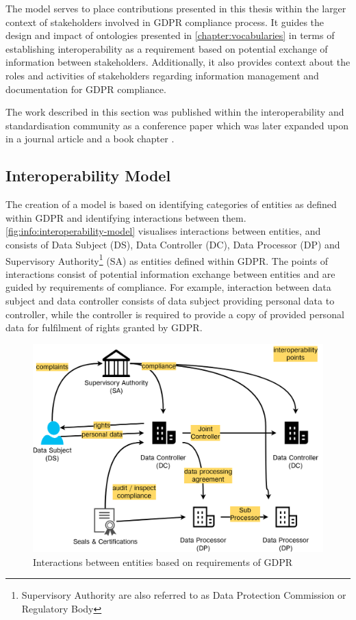 The model serves to place contributions presented in this thesis within the larger context of stakeholders involved in GDPR compliance process. It guides the design and impact of ontologies presented in \autoref{chapter:vocabularies} in terms of establishing interoperability as a requirement based on potential exchange of information between stakeholders. Additionally, it also provides context about the roles and activities of stakeholders regarding information management and documentation for GDPR compliance.

The work described in this section was published within the interoperability and standardisation community as a conference paper
\cite{pandit_gdpr_2018} which was later expanded upon in a journal article \cite{pandit_exploration_2018} and a book chapter \cite{pandit_standardisation_2020}.

\subsection*{Interoperability Model}
The creation of a model is based on identifying categories of entities as defined within GDPR and identifying interactions between them.
\autoref{fig:info:interoperability-model} visualises interactions between entities, and consists of Data Subject (DS), Data Controller (DC), Data Processor (DP) and Supervisory Authority\footnote{Supervisory Authority are also referred to as Data Protection Commission or Regulatory Body} (SA) as entities defined within GDPR.
The points of interactions consist of potential information exchange between entities and are guided by requirements of compliance. For example, interaction between data subject and data controller consists of data subject providing personal data to controller, while the controller is required to provide a copy of provided personal data for fulfilment of rights granted by GDPR.
\begin{figure}[htbp]
    \centering
    \includegraphics[width=0.75\linewidth]{img/interoperability-model.png}
    \caption{Interactions between entities based on requirements of GDPR \cite{pandit_exploration_2018}}
    \label{fig:info:interoperability-model}
\end{figure}

